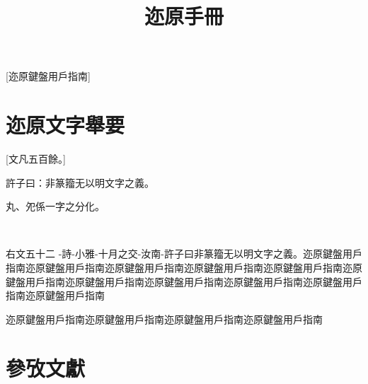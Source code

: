 \documentclass{zhvt-classic}
\title{迩原手冊}
\begin{document}
[迩原鍵盤用戶指南]

\cleardoublepage

\setcounter{page}{1}
\tableofcontents

\mainmatter

\chapter*{迩原文字舉要}[文凡五百餘。]

\begin{fw}
許子曰：非篆籀无以明文字之義。
\end{fw}

丸、夗係一字之分化。\cite{侯乃峯夗丸,鄔可晶續釋丸}

𧮫、希之上部係一文。\cite{安大簡絺綌,季旭昇絺綌,程燕𧮫}

\begin{fw}
右文五十二
\CJKunderwave-{詩}\CJKunderwave-{小雅}\CJKunderwave-{十月之交}\CJKunderline-{汝南}\CJKunderline-{許子}曰非篆籀无以明文字之義。迩原鍵盤用戶指南迩原鍵盤用戶指南迩原鍵盤用戶指南迩原鍵盤用戶指南迩原鍵盤用戶指南迩原鍵盤用戶指南迩原鍵盤用戶指南迩原鍵盤用戶指南迩原鍵盤用戶指南迩原鍵盤用戶指南迩原鍵盤用戶指南

迩原鍵盤用戶指南迩原鍵盤用戶指南迩原鍵盤用戶指南迩原鍵盤用戶指南
\end{fw}

\chapter*{參攷文獻}
\printbibliography[heading=none]
\end{document}
